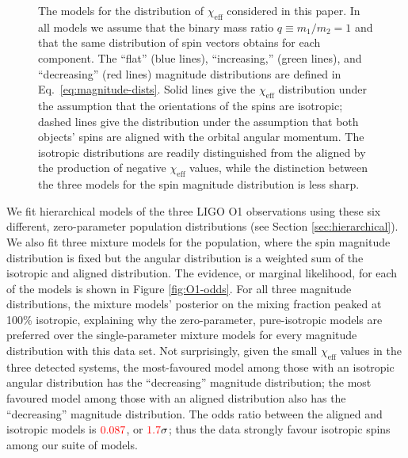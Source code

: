 \documentclass[modern,linenumbers]{aastex61}
\newcommand{\chieff}{\chi_\mathrm{eff}}
\newcommand{\checkme}[1]{\textcolor{red}{#1}}
\newcommand{\OOneSigmaIsoAligned}{\checkme{1.7}}
\newcommand{\OOneOddsIsoAligned}{\checkme{0.087}}
\begin{document}
\begin{figure}
  \caption{\label{fig:chieff-distribution-models} The models for the
    distribution of $\chieff$ considered in this paper.  In all models
    we assume that the binary mass ratio $q \equiv m_1/m_2 = 1$ and
    that the same distribution of spin vectors obtains for each
    component.  The ``flat'' (blue lines), ``increasing,'' (green
    lines), and ``decreasing'' (red lines) magnitude distributions are
    defined in Eq.\ \eqref{eq:magnitude-dists}.  Solid lines give the
    $\chieff$ distribution under the assumption that the orientations
    of the spins are isotropic; dashed lines give the distribution
    under the assumption that both objects' spins are aligned with the
    orbital angular momentum.  The isotropic distributions are readily
    distinguished from the aligned by the production of negative
    $\chieff$ values, while the distinction between the three models
    for the spin magnitude distribution is less sharp.}
\end{figure}

We fit hierarchical models of the three LIGO O1 observations using
these six different, zero-parameter population distributions (see
Section \ref{sec:hierarchical}).  We also fit three mixture models for
the population, where the spin magnitude distribution is fixed but the
angular distribution is a weighted sum of the isotropic and aligned
distribution.  The evidence, or marginal likelihood, for each of the
models is shown in Figure \ref{fig:O1-odds}.  For all three magnitude
distributions, the mixture models' posterior on the mixing fraction
peaked at 100\% isotropic, explaining why the zero-parameter,
pure-isotropic models are preferred over the single-parameter mixture
models for every magnitude distribution with this data set.  Not
surprisingly, given the small $\chieff$ values in the three detected
systems, the most-favoured model among those with an isotropic angular
distribution has the ``decreasing'' magnitude distribution; the most
favoured model among those with an aligned distribution also has the
``decreasing'' magnitude distribution.  The odds ratio between the
aligned and isotropic models is $\OOneOddsIsoAligned$, or
$\OOneSigmaIsoAligned\sigma$; thus the data strongly favour isotropic
spins among our suite of models.
\end{document}

